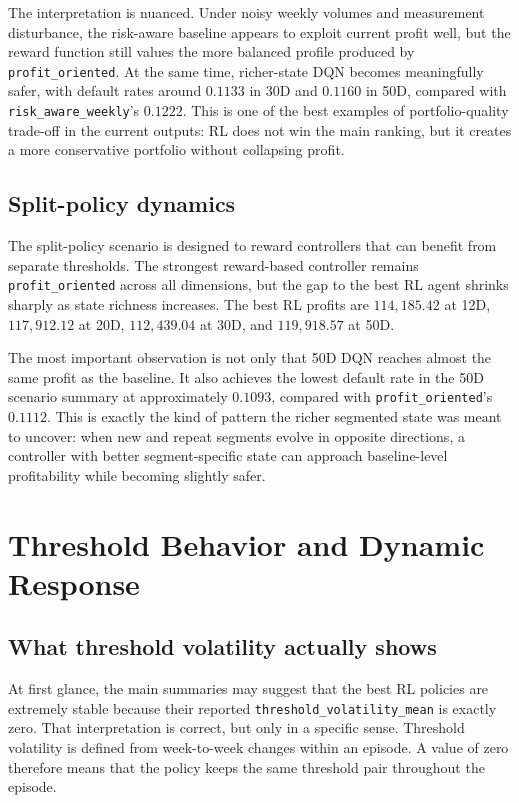 \documentclass[12pt,a4paper]{article}
\begin{document}
The interpretation is nuanced. Under noisy weekly volumes and measurement disturbance, the risk-aware baseline appears to exploit current profit well, but the reward function still values the more balanced profile produced by \texttt{profit\_oriented}. At the same time, richer-state DQN becomes meaningfully safer, with default rates around $0.1133$ in 30D and $0.1160$ in 50D, compared with \texttt{risk\_aware\_weekly}'s $0.1222$. This is one of the best examples of portfolio-quality trade-off in the current outputs: RL does not win the main ranking, but it creates a more conservative portfolio without collapsing profit.

\subsection{Split-policy dynamics}

The split-policy scenario is designed to reward controllers that can benefit from separate thresholds. The strongest reward-based controller remains \texttt{profit\_oriented} across all dimensions, but the gap to the best RL agent shrinks sharply as state richness increases. The best RL profits are $114{,}185.42$ at 12D, $117{,}912.12$ at 20D, $112{,}439.04$ at 30D, and $119{,}918.57$ at 50D.

The most important observation is not only that 50D DQN reaches almost the same profit as the baseline. It also achieves the lowest default rate in the 50D scenario summary at approximately $0.1093$, compared with \texttt{profit\_oriented}'s $0.1112$. This is exactly the kind of pattern the richer segmented state was meant to uncover: when new and repeat segments evolve in opposite directions, a controller with better segment-specific state can approach baseline-level profitability while becoming slightly safer.

\section{Threshold Behavior and Dynamic Response}

\subsection{What threshold volatility actually shows}

At first glance, the main summaries may suggest that the best RL policies are extremely stable because their reported \texttt{threshold\_volatility\_mean} is exactly zero. That interpretation is correct, but only in a specific sense. Threshold volatility is defined from week-to-week changes within an episode. A value of zero therefore means that the policy keeps the same threshold pair throughout the episode.
\end{document}
